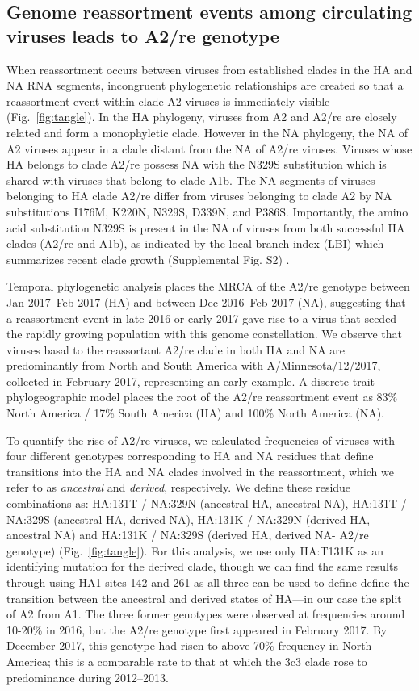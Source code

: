 \subsection*{Genome reassortment events among circulating viruses leads to A2/re genotype}
When reassortment occurs between viruses from established clades in the HA and NA RNA segments, incongruent phylogenetic relationships are created so that a reassortment event within clade A2 viruses is immediately visible (Fig.~\ref{fig:tangle}).
In the HA phylogeny, viruses from A2 and A2/re are closely related and form a monophyletic clade.
However in the NA phylogeny, the NA of A2 viruses appear in a clade distant from the NA of A2/re viruses.
Viruses whose HA belongs to clade A2/re possess NA with the N329S substitution which is shared with viruses that belong to clade A1b.
The NA segments of viruses belonging to HA clade A2/re differ from viruses belonging to clade A2 by NA substitutions I176M, K220N, N329S, D339N, and P386S.
Importantly, the amino acid substitution N329S is present in the NA of viruses from both successful HA clades (A2/re and A1b), as indicated by the local branch index (LBI) which summarizes recent clade growth (Supplemental Fig. S2) \citep{neher_predicting_2014}.

Temporal phylogenetic analysis places the MRCA of the A2/re genotype between Jan 2017--Feb 2017 (HA) and between Dec 2016--Feb 2017 (NA), suggesting that a reassortment event in late 2016 or early 2017 gave rise to a virus that seeded the rapidly growing population with this genome constellation.
We observe that viruses basal to the reassortant A2/re clade in both HA and NA are predominantly from North and South America with A/Minnesota/12/2017, collected in February 2017, representing an early example.
A discrete trait phylogeographic model places the root of the A2/re reassortment event as 83\% North America / 17\% South America (HA) and 100\% North America (NA).

To quantify the rise of A2/re viruses, we calculated frequencies of viruses with four different genotypes corresponding to HA and NA residues that define transitions into the HA and NA clades involved in the reassortment, which we refer to as \textit{ancestral} and \textit{derived}, respectively.
We define these residue combinations as: HA:131T / NA:329N (ancestral HA, ancestral NA), HA:131T / NA:329S (ancestral HA, derived NA), HA:131K / NA:329N (derived HA, ancestral NA) and HA:131K / NA:329S (derived HA, derived NA- A2/re genotype) (Fig.~\ref{fig:tangle}).
For this analysis, we use only HA:T131K as an identifying mutation for the derived clade, though we can find the same results through using HA1 sites 142 and 261 as all three can be used to define define the transition between the ancestral and derived states of HA---in our case the split of A2 from A1.
The three former genotypes were observed at frequencies around 10-20\% in 2016, but the A2/re genotype first appeared in February 2017.
By December 2017, this genotype had risen to above 70\% frequency in North America; this is a comparable rate to that at which the 3c3 clade rose to predominance during 2012–2013.

